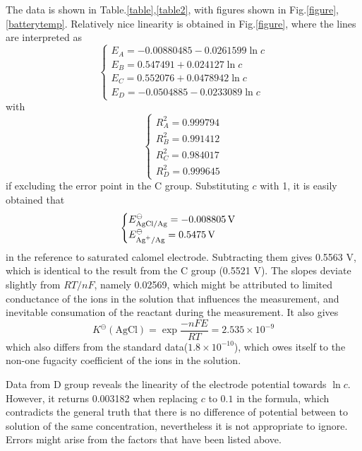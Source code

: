 \documentclass[%
 reprint,
 amsmath,amssymb,
 aps,
10.5pt,
]{revtex4-1}
\begin{document}
The data is shown in Table.\ref{table},\ref{table2}, with figures shown in Fig.\ref{figure},\ref{batterytemp}. Relatively nice linearity is obtained in Fig.\ref{figure}, where the lines are interpreted as
\begin{equation}
\begin{cases}
E_A = -0.00880485 - 0.0261599 \ln{c} \\
E_B = 0.547491 + 0.024127 \ln{c} \\
E_C = 0.552076 + 0.0478942 \ln{c} \\
E_D = -0.0504885 - 0.0233089 \ln{c}
\end{cases}
\end{equation}
with
\begin{equation}
\begin{cases}
R^2_A = 0.999794 \\
R^2_B = 0.991412 \\
R^2_C = 0.984017 \\
R^2_D = 0.999645
\end{cases}
\end{equation}
if excluding the error point in the C group. Substituting $c$ with 1, it is easily obtained that
\begin{equation}
\begin{cases}
E^\ominus_\text{AgCl/Ag} = -0.008805 \, \mathrm{V} \\
E^\ominus_\text{\ce{Ag+}/Ag} = 0.5475 \, \mathrm{V} 
\end{cases}
\end{equation}
in the reference to saturated calomel electrode. Subtracting them gives 0.5563 V, which is identical to the result from the C group (0.5521 V). The slopes deviate slightly from $RT/nF$, namely 0.02569, which might be attributed to limited conductance of the ions in the solution that influences the measurement, and inevitable consumation of the reactant during the measurement. It also gives
\begin{equation}
K^\ominus(\text{AgCl}) = \exp{\frac{-nFE}{RT}} = 2.535 \times 10^{-9}
\end{equation}
which also differs from the standard data($1.8\times 10^{-10}$), which owes itself to the non-one fugacity coefficient of the ions in the solution. 

Data from D group reveals the linearity of the electrode potential towards $\ln{c}$. However, it returns 0.003182 when replacing $c$ to $0.1$ in the formula, which contradicts the general truth that there is no difference of potential between to solution of the same concentration, nevertheless it is not appropriate to ignore. Errors might arise from the factors that have been listed above.
\end{document}
